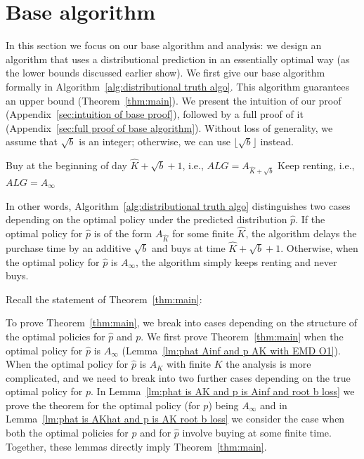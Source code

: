 \section{Base algorithm}
\label{appendix:analysis of the main algorithm}

In this section we focus on our base algorithm and analysis: we design an algorithm that uses a distributional prediction in an essentially optimal way (as the lower bounds discussed earlier show).  We first give our base algorithm formally in Algorithm~\ref{alg:distributional truth algo}. This algorithm guarantees an upper bound (Theorem~\ref{thm:main}). We present the intuition of our proof (Appendix~\ref{sec:intuition of base proof}), followed by a full proof of it (Appendix~\ref{sec:full proof of base algorithm}). Without loss of generality, we assume that $\sqrt{b}$ is an integer; otherwise, we can use $\lfloor \sqrt{b} \rfloor$ instead. 


\begin{algorithm}
\caption{Base algorithm, with expected additive loss bounded by $O(\sqrt{b}\max(\mathrm{EMD},1))$}
\label{alg:distributional truth algo}
\begin{algorithmic}[1]
    \STATE Buy at the beginning of day $\hat{K}+\sqrt{b}+1$, i.e., $ALG = A_{\hat{K}+\sqrt{b}}$
\ELSE
    \STATE Keep renting, i.e., $ALG = A_{\infty}$
\ENDIF
\end{algorithmic}
\end{algorithm}

In other words, Algorithm~\ref{alg:distributional truth algo} distinguishes two cases depending on the optimal policy under the predicted distribution $\hat p$.  If the optimal policy for $\hat p$ is of the form $A_{\hat K}$ for some finite $\hat K$, the algorithm delays the purchase time by an additive $\sqrt b$ and buys at time $\hat K + \sqrt b + 1$. Otherwise, when the optimal policy for $\hat p$ is $A_{\infty}$, the algorithm simply keeps renting and never buys.


Recall the statement of Theorem~\ref{thm:main}:

\maintheorem*

To prove Theorem~\ref{thm:main},
we break into cases depending on the structure of the optimal policies for $\hat p$ and $p$. We first prove Theorem~\ref{thm:main} when the optimal policy for $\hat p$ is $A_{\infty}$ (Lemma~\ref{lm:phat Ainf and p AK with EMD O1}). When the optimal policy for $\hat{p}$ is $A_K$ with finite $K$ the analysis is more complicated, and we need to break into two further cases depending on the true optimal policy for $p$. In Lemma~\ref{lm:phat is AK and p is Ainf and root b loss} we prove the theorem for the optimal policy (for $p$) being $A_{\infty}$ and in Lemma~\ref{lm:phat is AKhat and p is AK root b loss} we consider the case when both the optimal policies for $p$ and for $\hat p$ involve buying at some finite time.  Together, these lemmas directly imply Theorem~\ref{thm:main}.  


